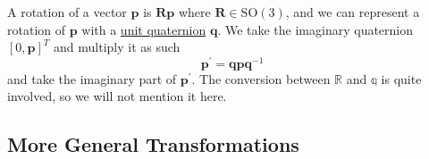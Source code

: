 \documentclass{article}
\begin{document}
  A rotation of a vector $\mathbf{p}$ is $\mathbf{R}\mathbf{p}$ where $\mathbf{R} \in \mathrm{SO}(3)$, and we can represent a rotation of $\mathbf{p}$ with a \hyperref[alg-def:unit-quaternion]{unit quaternion} $\mathbf{q}$. We take the imaginary quaternion $[0, \mathbf{p}]^T$ and multiply it as such
  \begin{equation}
    \mathbf{p}^\prime = \mathbf{q} \mathbf{p} \mathbf{q}^{-1}
  \end{equation}
  and take the imaginary part of $\mathbf{p}^\prime$. The conversion between $\mathbb{R}$ and $\mathbb{q}$ is quite involved, so we will not mention it here. 

  \subsection{More General Transformations}
\end{document}
